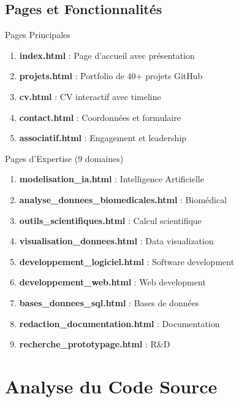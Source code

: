 \documentclass[12pt,a4paper]{article}
\begin{document}
\subsection{Pages et Fonctionnalités}

\begin{redbox}{Pages Principales}
\begin{enumerate}[label=\textcolor{redcolor}{\arabic*.}]
    \item \textbf{index.html} : Page d'accueil avec présentation
    \item \textbf{projets.html} : Portfolio de 40+ projets GitHub
    \item \textbf{cv.html} : CV interactif avec timeline
    \item \textbf{contact.html} : Coordonnées et formulaire
    \item \textbf{associatif.html} : Engagement et leadership
\end{enumerate}
\end{redbox}

\begin{greenbox}{Pages d'Expertise (9 domaines)}
\begin{enumerate}[label=\textcolor{greencolor}{\arabic*.}]
    \item \textbf{modelisation\_ia.html} : Intelligence Artificielle
    \item \textbf{analyse\_donnees\_biomedicales.html} : Biomédical
    \item \textbf{outils\_scientifiques.html} : Calcul scientifique
    \item \textbf{visualisation\_donnees.html} : Data visualization
    \item \textbf{developpement\_logiciel.html} : Software development
    \item \textbf{developpement\_web.html} : Web development
    \item \textbf{bases\_donnees\_sql.html} : Bases de données
    \item \textbf{redaction\_documentation.html} : Documentation
    \item \textbf{recherche\_prototypage.html} : R\&D
\end{enumerate}
\end{greenbox}

\section{Analyse du Code Source}
\end{document}
